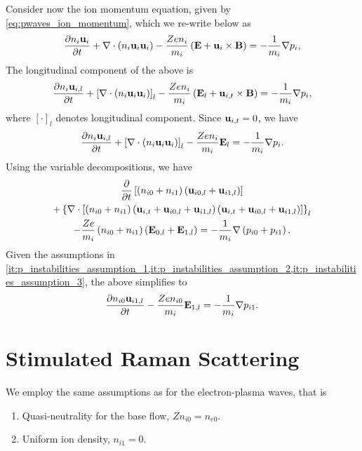 \documentclass[a4paper,11pt]{report}
\begin{document}
Consider now the ion momentum equation, given by \cref{eq:pwaves_ion_momentum}, which we re-write below as 
\begin{equation*}
    \frac{\partial n_i \mathbf{u}_i}{\partial t} + \nabla \cdot \left ( n_i \mathbf{u}_i \mathbf{u}_i \right ) - \frac{Ze n_i}{m_i} \left ( \mathbf{E} + \mathbf{u}_i \times \mathbf{B} \right ) = -\frac{1}{m_i} \nabla p_i,
\end{equation*}
The longitudinal component of the above is
\begin{equation*}
    \frac{\partial n_i \mathbf{u}_{i,l}}{\partial t} + \left [ \nabla \cdot \left (n_i \mathbf{u}_i \mathbf{u}_i \right ) \right ]_l - \frac{Z e n_i}{m_i} \left ( \mathbf{E}_l + \mathbf{u}_{i,t} \times \mathbf{B} \right ) = -\frac{1}{m_i} \nabla p_i,
\end{equation*}
where $[\cdot]_l$ denotes longitudinal component. Since $\mathbf{u}_{i,t} = 0$, we have
\begin{equation*}
    \frac{\partial n_i \mathbf{u}_{i,l}}{\partial t} + \left [ \nabla \cdot \left (n_i \mathbf{u}_i \mathbf{u}_i \right ) \right ]_l - \frac{Z e n_i}{m_i} \mathbf{E}_l = -\frac{1}{m_i} \nabla p_i.
\end{equation*}
Using the variable decompositions, we have
\begin{multline*}
    \frac{\partial}{\partial t} \left [ \left ( n_{i0} + n_{i1} \right ) \left ( \mathbf{u}_{i0,l} + \mathbf{u}_{i1,l} \right ) \right ] \\
    + \left \{ \nabla \cdot \left [ \left (n_{i0} + n_{i1} \right ) \left ( \mathbf{u}_{i,t} + \mathbf{u}_{i0,l} + \mathbf{u}_{i1,l} \right ) \left ( \mathbf{u}_{i,t} + \mathbf{u}_{i0,l} + \mathbf{u}_{i1,l} \right ) \right ] \right \}_l \\
    - \frac{Z e}{m_i} \left ( n_{i0} + n_{i1} \right ) \left ( \mathbf{E}_{0,l} + \mathbf{E}_{1,l} \right ) = - \frac{1}{m_i} \nabla \left ( p_{i0} + p_{i1} \right ).
\end{multline*}
Given the assumptions in \cref{it:p_instabilities_assumption_1,it:p_instabilities_assumption_2,it:p_instabilities_assumption_3}, the above simplifies to
\begin{equation}
    \label{eq:p_instabilities_i_mom_linearized}
    \frac{\partial n_{i0} \mathbf{u}_{i1,l}}{\partial t} - \frac{Z e n_{i0}}{m_i} \mathbf{E}_{1,l} = - \frac{1}{m_i} \nabla p_{i1}.
\end{equation}

\section{Stimulated Raman Scattering}
We employ the same assumptions as for the electron-plasma waves, that is 
\begin{enumerate}
    \item Quasi-neutrality for the base flow, $Zn_{i0} = n_{e0}$.
    \item Uniform ion density, $n_{i1} = 0$.
\end{enumerate}
\end{document}
